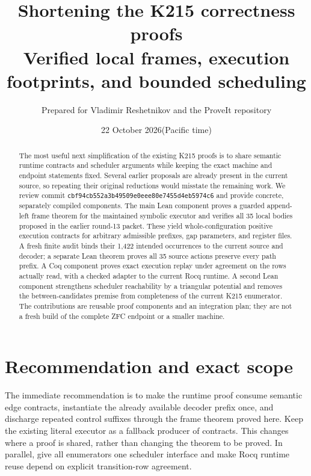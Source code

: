 \documentclass[11pt,letterpaper]{article}
\title{Shortening the K215 correctness proofs\large\\
Verified local frames, execution footprints, and bounded scheduling}
\author{Prepared for Vladimir Reshetnikov and the ProveIt repository}
\date{22 October 2026\quad\textnormal{(Pacific time)}}
\theoremstyle{definition}
\theoremstyle{remark}
\begin{document}
\maketitle
\begin{abstract}
The most useful next simplification of the existing K215 proofs is to share
semantic runtime contracts and scheduler arguments while keeping the exact
machine and endpoint statements fixed. Several earlier proposals are already
present in the current source, so repeating their original reductions would
misstate the remaining work. We review commit
\texttt{cbf94cb552a3b49509e0eee80e7455d4eb5974c6} and provide concrete,
separately compiled components. The main Lean component proves a guarded
append-left frame theorem for the maintained symbolic executor and verifies
all 35 local bodies proposed in the earlier round-13 packet. These yield
whole-configuration positive execution contracts for arbitrary admissible
prefixes, gap parameters, and register files. A fresh finite audit binds their
1,422 intended occurrences to the current source and decoder; a separate Lean
theorem proves all 35 source actions preserve every path prefix. A Coq component
proves exact execution replay under agreement on the rows actually read,
with a checked adapter to the current Rocq runtime. A second Lean component
strengthens scheduler reachability by a triangular potential and removes the
between-candidates premise from completeness of the current K215 enumerator.
The contributions are reusable proof components and an integration plan;
they are not a fresh build of the complete ZFC endpoint or a smaller machine.
\end{abstract}

\begingroup
\small
\setlength{\parskip}{0pt}
\tableofcontents
\endgroup
\newpage

\section{Recommendation and exact scope}

The immediate recommendation is to make the runtime proof consume semantic
edge contracts, instantiate the already available decoder prefix once, and
discharge repeated control suffixes through the frame theorem proved here.
Keep the existing literal executor as a fallback producer of contracts.
This changes where a proof is shared, rather than changing the theorem to be
proved. In parallel, give all enumerators one scheduler interface and make
Rocq runtime reuse depend on explicit transition-row agreement.
\end{document}
